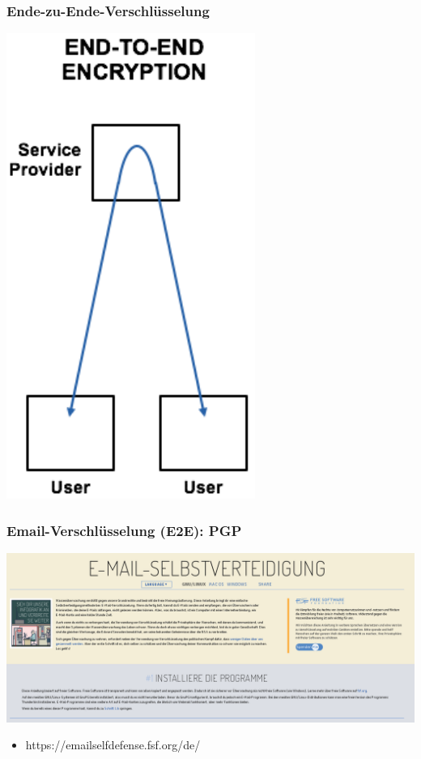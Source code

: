 \begin{frame}
    \frametitle{Ende-zu-Ende-Verschlüsselung}
    \begin{center}
      \includegraphics[height=0.8\textheight]{../../img/enc-e2e.png}
    \end{center}
\end{frame}

\begin{frame}
  \frametitle{Email-Verschlüsselung (E2E): PGP}
  \begin{center}
    \includegraphics[height=0.5\textheight]{../../img/emailselfdefense.png}
    \begin{itemize}
      \item https://emailselfdefense.fsf.org/de/
    \end{itemize}
  \end{center}
\end{frame}


